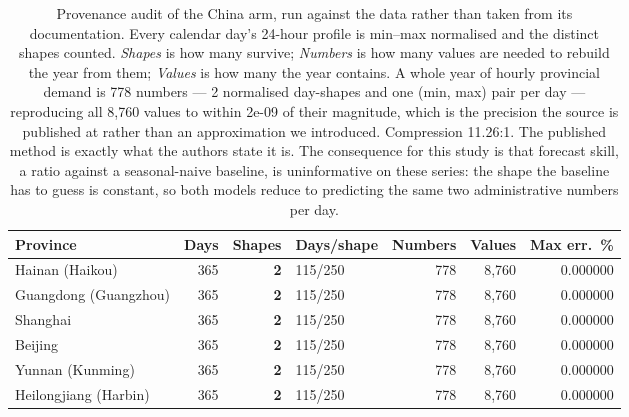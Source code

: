 \begin{table}[t]
\centering
\footnotesize
\setlength{\tabcolsep}{3pt}
\begin{tabular}{lrrlrrr}
\toprule
Province & Days & Shapes & Days/shape & Numbers & Values & Max err.\ \% \\
\midrule
Hainan (Haikou) & 365 & \textbf{2} & 115/250 & 778 & 8,760 & 0.000000 \\
Guangdong (Guangzhou) & 365 & \textbf{2} & 115/250 & 778 & 8,760 & 0.000000 \\
Shanghai & 365 & \textbf{2} & 115/250 & 778 & 8,760 & 0.000000 \\
Beijing & 365 & \textbf{2} & 115/250 & 778 & 8,760 & 0.000000 \\
Yunnan (Kunming) & 365 & \textbf{2} & 115/250 & 778 & 8,760 & 0.000000 \\
Heilongjiang (Harbin) & 365 & \textbf{2} & 115/250 & 778 & 8,760 & 0.000000 \\
\bottomrule
\end{tabular}
\caption{Provenance audit of the China arm, run against the data rather than taken from its documentation. Every calendar day's 24-hour profile is min--max normalised and the distinct shapes counted. \emph{Shapes} is how many survive; \emph{Numbers} is how many values are needed to rebuild the year from them; \emph{Values} is how many the year contains. A whole year of hourly provincial demand is 778 numbers --- 2 normalised day-shapes and one (min, max) pair per day --- reproducing all 8,760 values to within 2e-09 of their magnitude, which is the precision the source is published at rather than an approximation we introduced. Compression 11.26:1. The published method is exactly what the authors state it is. The consequence for this study is that forecast skill, a ratio against a seasonal-naive baseline, is uninformative on these series: the shape the baseline has to guess is constant, so both models reduce to predicting the same two administrative numbers per day.}
\label{tab:china-audit}
\end{table}

